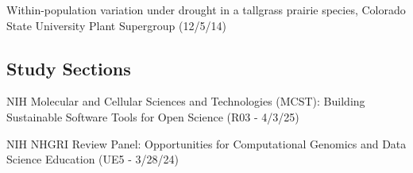 \documentclass{cv}
\begin{document}
Within-population variation under drought in a tallgrass prairie species, Colorado State University Plant Supergroup (12/5/14)

\subsection*{Study Sections}

NIH Molecular and Cellular Sciences and Technologies (MCST): Building Sustainable Software Tools for Open Science (R03 - 4/3/25)

NIH NHGRI Review Panel: Opportunities for Computational Genomics and Data Science Education (UE5 - 3/28/24)


%
%
%
%
\end{document}
